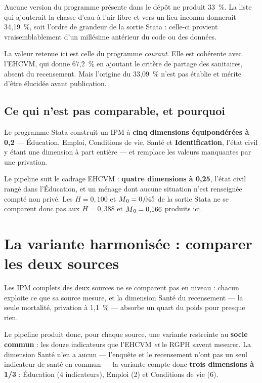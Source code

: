 \documentclass[11pt,a4paper]{article}
\begin{document}
Aucune version du programme présente dans le dépôt ne produit 33~\%. La liste qui ajouterait la
chasse d'eau à l'air libre et vers un lieu inconnu donnerait 34,19~\%, soit l'ordre de grandeur de
la sortie Stata : celle-ci provient vraisemblablement d'un millésime antérieur du code ou des
données.

\begin{attention}
La valeur retenue ici est celle du programme \emph{courant}. Elle est cohérente avec l'EHCVM, qui
donne 67,2~\% en ajoutant le critère de partage des sanitaires, absent du recensement. Mais
l'origine du 33,09~\% n'est pas établie et mérite d'être élucidée avant publication.
\end{attention}

\subsection{Ce qui n'est pas comparable, et pourquoi}

Le programme Stata construit un IPM à \textbf{cinq dimensions équipondérées à 0,2} --- Éducation,
Emploi, Conditions de vie, Santé et \textbf{Identification}, l'état civil y étant une dimension à
part entière --- et remplace les valeurs manquantes par une privation.

Le pipeline suit le cadrage EHCVM : \textbf{quatre dimensions à 0,25}, l'état civil rangé dans
l'Éducation, et un ménage dont aucune situation n'est renseignée compté non privé. Les
$H = 0{,}100$ et $M\textsubscript{0} = 0{,}045$ de la sortie Stata ne se comparent donc pas aux
$H = 0{,}388$ et $M\textsubscript{0} = 0{,}166$ produits ici.

\section{La variante harmonisée : comparer les deux sources}
\label{sec:harmonise}

Les IPM complets des deux sources ne se comparent pas en niveau : chacun exploite ce que sa source
mesure, et la dimension Santé du recensement --- la seule mortalité, privation à 1,1~\% --- absorbe
un quart du poids pour presque rien.

Le pipeline produit donc, pour chaque source, une variante restreinte au \textbf{socle commun} :
les douze indicateurs que l'EHCVM \emph{et} le RGPH savent mesurer. La dimension Santé n'en a aucun
--- l'enquête et le recensement n'ont pas un seul indicateur de santé en commun --- la variante
compte donc \textbf{trois dimensions à 1/3} : Éducation (4 indicateurs), Emploi (2) et Conditions
de vie (6).
\end{document}
